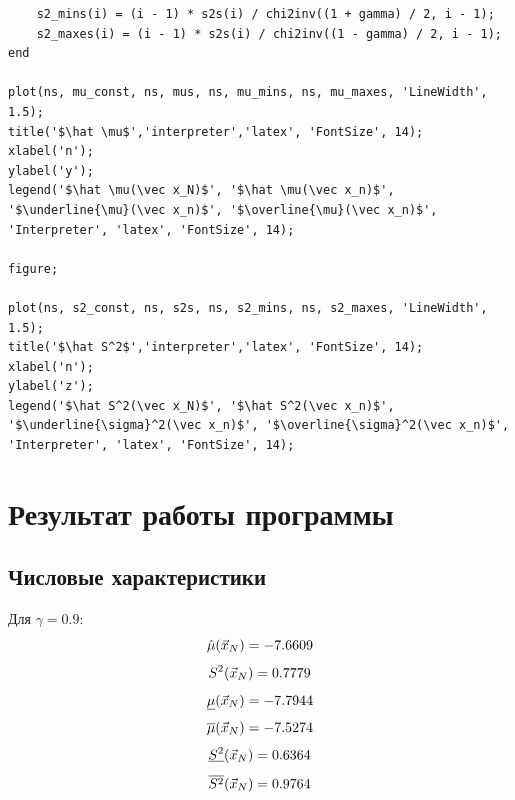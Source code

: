 \begin{lstlisting}
    s2_mins(i) = (i - 1) * s2s(i) / chi2inv((1 + gamma) / 2, i - 1);
    s2_maxes(i) = (i - 1) * s2s(i) / chi2inv((1 - gamma) / 2, i - 1);
end

plot(ns, mu_const, ns, mus, ns, mu_mins, ns, mu_maxes, 'LineWidth', 1.5);
title('$\hat \mu$','interpreter','latex', 'FontSize', 14);
xlabel('n');
ylabel('y');
legend('$\hat \mu(\vec x_N)$', '$\hat \mu(\vec x_n)$', '$\underline{\mu}(\vec x_n)$', '$\overline{\mu}(\vec x_n)$', 'Interpreter', 'latex', 'FontSize', 14);

figure;

plot(ns, s2_const, ns, s2s, ns, s2_mins, ns, s2_maxes, 'LineWidth', 1.5);
title('$\hat S^2$','interpreter','latex', 'FontSize', 14);
xlabel('n');
ylabel('z');
legend('$\hat S^2(\vec x_N)$', '$\hat S^2(\vec x_n)$', '$\underline{\sigma}^2(\vec x_n)$', '$\overline{\sigma}^2(\vec x_n)$', 'Interpreter', 'latex', 'FontSize', 14);
\end{lstlisting}

\section{Результат работы программы}

\subsection{Числовые характеристики}
Для $\gamma = 0.9$:
\begin{equation*}
	\hat\mu(\vec x_N) = -7.6609\\
\end{equation*}
\begin{equation*}
	S^2(\vec x_N) = 0.7779\\
\end{equation*}
\begin{equation*}
	\underline\mu(\vec x_N) = -7.7944\\
\end{equation*}
\begin{equation*}
	\overline\mu(\vec x_N) = -7.5274 \\
\end{equation*}
\begin{equation*}
	\underline{S^2}(\vec x_N) = 0.6364\\
\end{equation*}
\begin{equation*}
	\overline{S^2}(\vec x_N) = 0.9764\\
\end{equation*}

